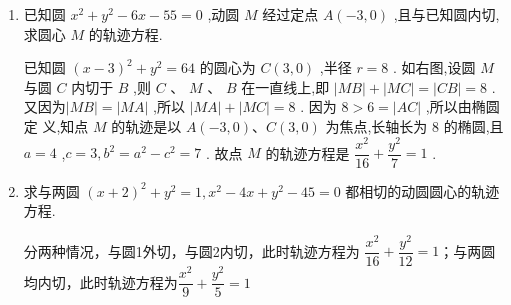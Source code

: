 \begin{enumerate}
\begin{jieda}
\begin{enumerate}
            $\therefore 2 k x_1 x_2+(b-k)\left(x_1+x_2\right)-2 b=0$
            
            
            联立方程 $\left\{\begin{array}{l}x^2+y^2=4 \\ y=k x+b\end{array}\right.$ ，得 $\left(k^2+1\right) x^2+2 k b x+b^2-4=0$ ，因此$\left\{\begin{array}{l}
                 x_1+x_2=\dfrac{-2 k b}{k^2+1} \\
                 x_1 x_2=\dfrac{b^2-4}{k^2+1}
            \end{array}\right.$

            $\therefore 2 k \dfrac{b^2-4}{k^2+1}+(b-k)\left(\dfrac{-2 k b}{k^2+1}\right)-2 b=0$，即$2 k\left(b^2-4\right)-2 k b(b-k)-2 b\left(k^2+1\right)=0$

            故$b = -4k$，则直线 $l$ 始终经过此定点 $(4,0)$ ．
            
        \end{enumerate}
    \end{jieda}
    
    \item 已知圆 ${x}^{2} + {y}^{2} - {6x} - {55} = 0$ ,动圆 $M$ 经过定点 $A\left( {-3,0}\right)$ ,且与已知圆内切,求圆心 $M$ 的轨迹方程.
    \begin{jieda}
        已知圆 ${\left( x - 3\right) }^{2} + {y}^{2} = {64}$ 的圆心为 $C\left( {3,0}\right)$ ,半径 $r = 8$ . 如右图,设圆 $M$与圆 $C$ 内切于 $B$ ,则 $C$ 、 $M$ 、 $B$ 在一直线上,即 $\left| {MB}\right|  + \left| {MC}\right|  = \left| {CB}\right|  = 8$ . 又因为$\left| {MB}\right|  = \left| {MA}\right|$ ,所以 $\left| {MA}\right|  + \left| {MC}\right|  = 8$ . 因为 $8 > 6 = \left| {AC}\right|$ ,所以由椭圆定
        义,知点 $M$ 的轨迹是以 $A\left( {-3,0}\right) \text{、}C\left( {3,0}\right)$ 为焦点,长轴长为 8 的椭圆,且 $a = 4$ ,$c = 3,{b}^{2} = {a}^{2} - {c}^{2} = 7$ . 故点 $M$ 的轨迹方程是 $\dfrac{{x}^{2}}{16} + \dfrac{{y}^{2}}{7} = 1$ .
    \end{jieda}
    
    \item 求与两圆 ${\left( x + 2\right) }^{2} + {y}^{2} = 1,{x}^{2} - {4x} + {y}^{2} - {45} = 0$ 都相切的动圆圆心的轨迹方程.
    \begin{jieda}
        分两种情况，与圆1外切，与圆2内切，此时轨迹方程为
        $\dfrac{{x}^{2}}{16} + \dfrac{{y}^{2}}{12} = 1$；与两圆均内切，此时轨迹方程为$\dfrac{{x}^{2}}{9} + \dfrac{{y}^{2}}{5} = 1$
    \end{jieda}


\end{enumerate}
